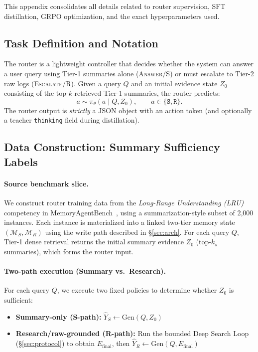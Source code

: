 \documentclass{article}
\theoremstyle{plain}
\theoremstyle{definition}
\theoremstyle{remark}
\newcommand{\Msum}{\mathcal{M}_S}        %
\newcommand{\Mraw}{\mathcal{M}_R}        %
\begin{document}
This appendix consolidates all details related to router supervision, SFT distillation, GRPO optimization, and the exact hyperparameters used.

\subsection{Task Definition and Notation}
\label{app:router_task}

The router is a lightweight controller that decides whether the system can answer a user query using Tier-1 summaries alone (\textsc{Answer}/S) or must escalate to Tier-2 raw logs (\textsc{Escalate}/R).
Given a query $Q$ and an initial evidence state $Z_0$ consisting of the top-$k$ retrieved Tier-1 summaries, the router predicts:
\[
a \sim \pi_\theta(a \mid Q, Z_0), \qquad a \in \{\texttt{S},\texttt{R}\}.
\]
The router output is \emph{strictly} a JSON object with an action token (and optionally a teacher \texttt{thinking} field during distillation).

\subsection{Data Construction: Summary Sufficiency Labels}
\label{app:router_data}

\paragraph{Source benchmark slice.}
We construct router training data from the \emph{Long-Range Understanding (LRU)} competency in MemoryAgentBench~\cite{hu_evaluating_2025}, using a summarization-style subset of 2,000 instances. Each instance is materialized into a linked two-tier memory state $(\Msum,\Mraw)$ using the write path described in \S\ref{sec:arch}.
For each query $Q$, Tier-1 dense retrieval returns the initial summary evidence $Z_0$ (top-$k_s$ summaries), which forms the router input.

\paragraph{Two-path execution (Summary vs.\ Research).}
For each query $Q$, we execute two fixed policies to determine whether $Z_0$ is sufficient:
\begin{itemize}
  \item \textbf{Summary-only (S-path):} $\hat{Y}_S \leftarrow \mathrm{Gen}(Q, Z_0)$
  \item \textbf{Research/raw-grounded (R-path):} Run the bounded Deep Search Loop (\S\ref{sec:protocol}) to obtain $E_{\mathrm{final}}$, then $\hat{Y}_R \leftarrow \mathrm{Gen}(Q, E_{\mathrm{final}})$
\end{itemize}
\end{document}
